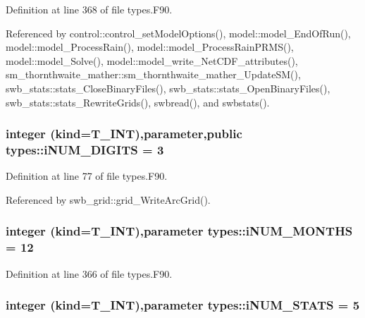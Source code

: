 Definition at line 368 of file types.F90.



Referenced by control::control\_\-setModelOptions(), model::model\_\-EndOfRun(), model::model\_\-ProcessRain(), model::model\_\-ProcessRainPRMS(), model::model\_\-Solve(), model::model\_\-write\_\-NetCDF\_\-attributes(), sm\_\-thornthwaite\_\-mather::sm\_\-thornthwaite\_\-mather\_\-UpdateSM(), swb\_\-stats::stats\_\-CloseBinaryFiles(), swb\_\-stats::stats\_\-OpenBinaryFiles(), swb\_\-stats::stats\_\-RewriteGrids(), swbread(), and swbstats().

\hypertarget{namespacetypes_a4255711de8681fefcdb67943aa2d812f}{
\subsubsection[{iNUM\_\-DIGITS}]{\setlength{\rightskip}{0pt plus 5cm}integer (kind={\bf T\_\-INT}),parameter,public {\bf types::iNUM\_\-DIGITS} = 3}}
\label{namespacetypes_a4255711de8681fefcdb67943aa2d812f}


Definition at line 77 of file types.F90.



Referenced by swb\_\-grid::grid\_\-WriteArcGrid().

\hypertarget{namespacetypes_a3fa6b4fbd911543da65649a0f5ec7ded}{
\subsubsection[{iNUM\_\-MONTHS}]{\setlength{\rightskip}{0pt plus 5cm}integer (kind={\bf T\_\-INT}),parameter {\bf types::iNUM\_\-MONTHS} = 12}}
\label{namespacetypes_a3fa6b4fbd911543da65649a0f5ec7ded}


Definition at line 366 of file types.F90.

\hypertarget{namespacetypes_a4c56fb4b9e90eaa04e36102300d88ba6}{
\subsubsection[{iNUM\_\-STATS}]{\setlength{\rightskip}{0pt plus 5cm}integer (kind={\bf T\_\-INT}),parameter {\bf types::iNUM\_\-STATS} = 5}}
\label{namespacetypes_a4c56fb4b9e90eaa04e36102300d88ba6}


